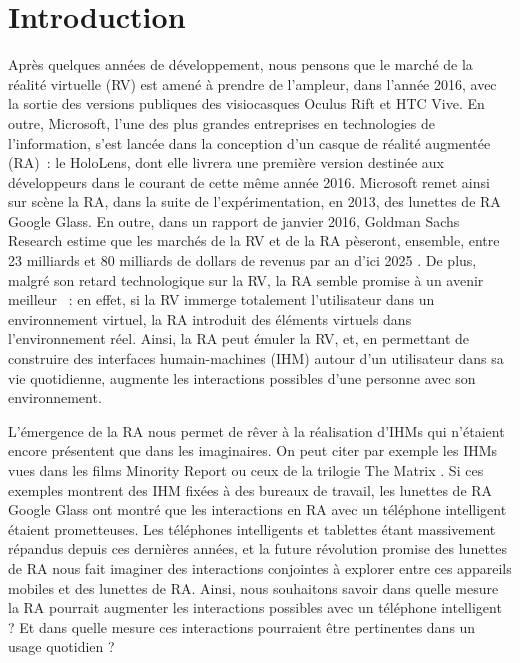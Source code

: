 \section*{Introduction}
Après quelques années de développement, nous pensons que le marché de la réalité virtuelle (RV) est amené à prendre de l'ampleur, dans l'année 2016, avec la sortie des versions publiques des visiocasques Oculus Rift et HTC Vive. En outre, Microsoft, l'une des plus grandes entreprises en technologies de l'information, s'est lancée dans la conception d'un casque de réalité augmentée (RA)~: le HoloLens, dont elle livrera une première version destinée aux développeurs dans le courant de cette même année 2016. Microsoft remet ainsi sur scène la RA, dans la suite de l'expérimentation, en 2013, des lunettes de RA Google Glass. En outre, dans un rapport de janvier 2016, Goldman Sachs Research estime que les marchés de la RV et de la RA pèseront, ensemble, entre 23 milliards et 80 milliards de dollars de revenus par an d'ici 2025 \citep{BelliniChenSugiyamaEtAl2016}. De plus, malgré son retard technologique sur la RV, la RA semble promise à un avenir meilleur \citep{BelliniChenSugiyamaEtAl2016}~: en effet, si la RV immerge totalement l'utilisateur dans un environnement virtuel, la RA introduit des éléments virtuels dans l'environnement réel. Ainsi, la RA peut émuler la RV, et, en permettant de construire des interfaces humain-machines (IHM) autour d'un utilisateur dans sa vie quotidienne, augmente les interactions possibles d'une personne avec son environnement.

L'émergence de la RA nous permet de rêver à la réalisation d'IHMs qui n'étaient encore présentent que dans les imaginaires. On peut citer par exemple les IHMs vues dans les films Minority Report  ou ceux de la trilogie The Matrix . Si ces exemples montrent des IHM fixées à des bureaux de travail, les lunettes de RA Google Glass ont montré que les interactions en RA avec un téléphone intelligent étaient prometteuses. Les téléphones intelligents et tablettes étant massivement répandus depuis ces dernières années, et la future révolution promise des lunettes de RA nous fait imaginer des interactions conjointes à explorer entre ces appareils mobiles et des lunettes de RA. Ainsi, nous souhaitons savoir dans quelle mesure la RA pourrait augmenter les interactions possibles avec un téléphone intelligent ? Et dans quelle mesure ces interactions pourraient être pertinentes dans un usage quotidien ?

